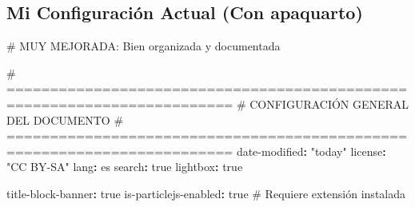 \documentclass[
  doc,
  floatsintext,
  longtable,
  a4paper,
  nolmodern,
  notxfonts,
  notimes,
  12pt,
  colorlinks=true,linkcolor=blue,citecolor=blue,urlcolor=blue]{apa7}
\newenvironment{Shaded}{\begin{snugshade}}{\end{snugshade}}
\newcommand{\AttributeTok}[1]{\textcolor[rgb]{0.40,0.45,0.13}{#1}}
\newcommand{\CharTok}[1]{\textcolor[rgb]{0.13,0.47,0.30}{#1}}
\newcommand{\CommentTok}[1]{\textcolor[rgb]{0.37,0.37,0.37}{#1}}
\newcommand{\FunctionTok}[1]{\textcolor[rgb]{0.28,0.35,0.67}{#1}}
\newcommand{\KeywordTok}[1]{\textcolor[rgb]{0.00,0.23,0.31}{\textbf{#1}}}
\newcommand{\StringTok}[1]{\textcolor[rgb]{0.13,0.47,0.30}{#1}}
\begin{document}
\subsection{Mi Configuración Actual (Con
apaquarto)}\label{mi-configuraciuxf3n-actual-con-apaquarto}

\begin{Shaded}
\begin{Highlighting}[]
\CommentTok{\# MUY MEJORADA: Bien organizada y documentada}

\CommentTok{\# ========================================================================}
\CommentTok{\# CONFIGURACIÓN GENERAL DEL DOCUMENTO}
\CommentTok{\# ========================================================================}
\FunctionTok{date{-}modified}\KeywordTok{:}\AttributeTok{ }\StringTok{"today"}
\FunctionTok{license}\KeywordTok{:}\AttributeTok{ }\StringTok{"CC BY{-}SA"}
\FunctionTok{lang}\KeywordTok{:}\AttributeTok{ es}
\FunctionTok{search}\KeywordTok{:}\AttributeTok{ }\CharTok{true}
\FunctionTok{lightbox}\KeywordTok{:}\AttributeTok{ }\CharTok{true}

\FunctionTok{title{-}block{-}banner}\KeywordTok{:}\AttributeTok{ }\CharTok{true}
\FunctionTok{is{-}particlejs{-}enabled}\KeywordTok{:}\AttributeTok{ }\CharTok{true}\CommentTok{  \#  Requiere extensión instalada}


\end{Highlighting}
\end{Shaded}
\end{document}
